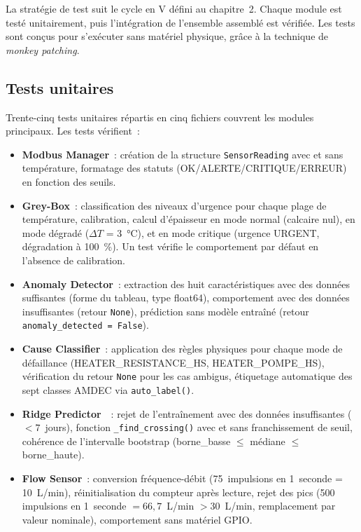 La stratégie de test suit le cycle en V défini au chapitre~2. Chaque module est testé unitairement, puis l'intégration de l'ensemble assemblé est vérifiée. Les tests sont conçus pour s'exécuter sans matériel physique, grâce à la technique de \textit{monkey patching}.

\subsection{Tests unitaires}

Trente-cinq tests unitaires répartis en cinq fichiers couvrent les modules principaux. Les tests vérifient~:

\begin{itemize}
  \item \textbf{Modbus Manager}~: création de la structure \texttt{SensorReading} avec et sans température, formatage des statuts (OK/ALERTE/CRITIQUE/ERREUR) en fonction des seuils.
  \item \textbf{Grey-Box}~: classification des niveaux d'urgence pour chaque plage de température, calibration, calcul d'épaisseur en mode normal (calcaire nul), en mode dégradé (\(\Delta T\) = 3~\si{\celsius}), et en mode critique (urgence URGENT, dégradation à 100~\%). Un test vérifie le comportement par défaut en l'absence de calibration.
  \item \textbf{Anomaly Detector}~: extraction des huit caractéristiques avec des données suffisantes (forme du tableau, type float64), comportement avec des données insuffisantes (retour \texttt{None}), prédiction sans modèle entraîné (retour \texttt{anomaly\_detected = False}).
  \item \textbf{Cause Classifier}~: application des règles physiques pour chaque mode de défaillance (HEATER\_RESISTANCE\_HS, HEATER\_POMPE\_HS), vérification du retour \texttt{None} pour les cas ambigus, étiquetage automatique des sept classes AMDEC via \texttt{auto\_label()}.
  \item \textbf{Ridge Predictor}~~: rejet de l'entraînement avec des données insuffisantes (\(<7\)~jours), fonction \texttt{\_find\_crossing()} avec et sans franchissement de seuil, cohérence de l'intervalle bootstrap (borne\_basse \(\leq\) médiane \(\leq\) borne\_haute).
  \item \textbf{Flow Sensor}~: conversion fréquence-débit (75~impulsions en 1~seconde = 10~L/min), réinitialisation du compteur après lecture, rejet des pics (500 impulsions en 1~seconde \(= 66,7\)~L/min \(>30\)~L/min, remplacement par valeur nominale), comportement sans matériel GPIO.
\end{itemize}

